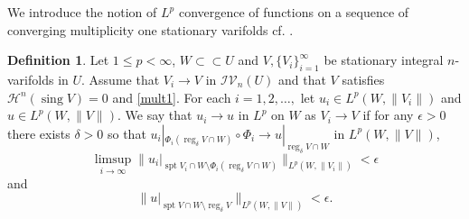 \documentclass[11pt]{amsart}
\theoremstyle{definition}
\newtheorem{definition}[theorem]{Definition}
\newcommand{\HH}{\mathcal{H}}
\newcommand{\IV}{\mathcal{IV}}
\newcommand{\ssubset}{\subset\subset}
\DeclareMathOperator{\spt}{spt}
\DeclareMathOperator{\sing}{sing}
\DeclareMathOperator{\reg}{reg}
\begin{document}
We introduce the notion of $L^p$ convergence of functions on a sequence of converging multiplicity one stationary varifolds cf. \cite[Definition~1.2]{D}.

\begin{definition}\label{lp}
	Let $1 \le p < \infty$, $W \ssubset U$ and $V, \{V_i\}_{i=1}^\infty$ be stationary integral $n$-varifolds in $U$. Assume that $V_i \to V$ in $\IV_n(U)$ and that $V$ satisfies  $\HH^{n}(\sing V)=0$ and \eqref{mult1}.
    For each $i=1,2,\dots,$ let $u_i\in L^p(W,\|V_i\|)$ and $u\in L^p(W,\|V\|)$. We say that $u_i\to u$ in $L^p$ on $W$ as $V_i\to V$ if for any $\epsilon>0$ there exists $\delta>0$ so that $u_i|_{\Phi_i(\reg_\delta V\cap W)}\circ \Phi_i\to u|_{\reg_\delta V\cap W}$ in $L^p(W,\|V\|)$, \[\limsup_{i\to\infty}\|u_i|_{\spt V_i\cap W\setminus \Phi_i(\reg_\delta V\cap W)}\|_{L^p(W,\|V_i\|)}< \epsilon\] and \[\|u|_{\spt V\cap W\setminus \reg_\delta V}\|_{L^p(W,\|V\|)}< \epsilon.\]
\end{definition}
\end{document}

